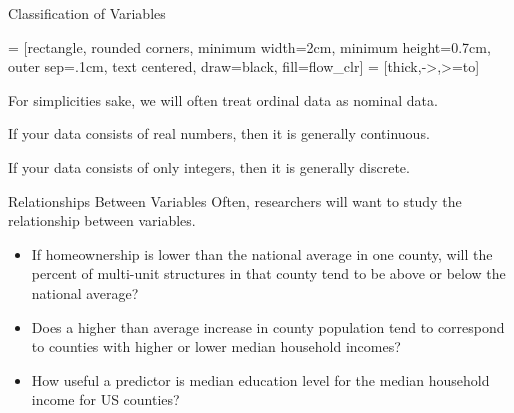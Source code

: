\documentclass{beamer}
\begin{document}
\begin{frame}
\begin{block}{Classification of Variables}
\begin{center}
 = [rectangle, rounded corners, minimum width=2cm, minimum height=0.7cm, outer sep=.1cm, text centered, draw=black, fill=flow_clr]
 = [thick,->,>=to]
\end{center}
\end{block}\pause

\begin{note}
For simplicities sake, we will often treat ordinal data as nominal data.
\end{note}\pause 
\begin{note} 
If your data consists of real numbers, then it is generally continuous.
\end{note}\pause

\begin{note}
If your data consists of only integers, then it is generally discrete.
\end{note}
\end{frame}

\begin{frame}
\begin{block}{Relationships Between Variables}
Often, researchers will want to study the relationship between variables.\pause

\begin{itemize}
\item If homeownership is lower than the national average in one county, will the percent of multi-unit structures in that county tend to be above or below the national average?\pause
\item Does a higher than average increase in county population tend to correspond to counties with higher or lower median household incomes?\pause
\item How useful a predictor is median education level for the median household income for US counties?
\end{itemize}
\end{block}
\end{frame}
\end{document}
